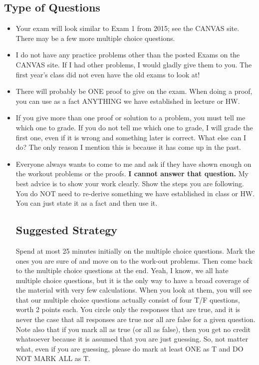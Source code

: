 \documentclass[letterpaper]{article}
\begin{document}
\subsection*{Type of Questions}

\begin{itemize}

\item Your exam will look similar to Exam 1 from 2015; see the CANVAS site. There may be a few more multiple choice questions.


\item I do not have any practice problems other than the posted Exams on the CANVAS site. If I had other problems, I would gladly give them to you. The first year's class did not even have the old exams to look at!

    \item There will probably be ONE proof to give on the exam. When doing a proof, you can use as a fact ANYTHING we have established in lecture or HW.

        \item If you give more than one proof or solution to a problem, you must tell me which one to grade. If you do not tell me which one to grade, I will grade the first one, even if it is wrong and something later is correct. What else can I do? The only reason I mention this is because it has come up in the past.

        \item Everyone always wants to come to me and ask if they have shown enough on the workout problems or the proofs. \textbf{I cannot answer that question.} My best advice is to show your work clearly. Show the steps you are following. You do NOT need to re-derive something we have established in class or HW. You can just state it as a fact and then use it.

\subsection*{Suggested Strategy}

Spend at most 25 minutes initially on the multiple choice questions. Mark the ones you are sure of and move on to the work-out problems. Then come back to the multiple choice questions at the end. Yeah, I know, we all hate multiple choice questions, but it is the only way to have a broad coverage of the material with very few calculations. When you look at them, you will see that our multiple choice questions actually consist of four T/F questions, worth 2 points each. You circle only the responses that are true, and it is never the case that all responses are true nor all are false for a given question. Note also that if you mark all as true (or all as false), then you get no credit whatsoever because it is assumed that you are just guessing. So, not matter what, even if you are guessing, please do mark at least ONE as T and DO NOT MARK ALL as T.


\end{itemize}
\end{document}
